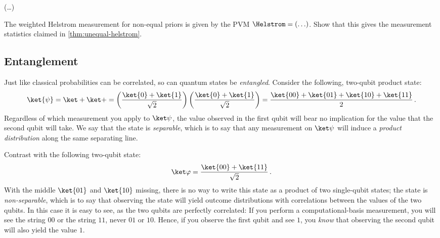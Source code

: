           \begin{exercise}
            (\ldots)
            \begin{subex}
              \item The weighted Helstrom measurement for non-equal priors is given
                by the PVM $\Helstrom = (\ldots)$. Show that this gives the
                measurement statistics claimed in \cref{thm:unequal-helstrom}.
            \end{subex}
          \end{exercise}
        \fi

        \let\unknown\undefined
        \let\orthpsi\undefined
        \let\orthphi\undefined

  \subsection{Entanglement}\label{sec:entanglement}
    Just like classical probabilities can be correlated, so can quantum states
      be \emph{entangled}. Consider the following, two-qubit product state:
    \[
      \ket{\psi} = \ket + \ket + 
      = \left( \frac{
        \ket{0} + \ket{1}
      }{\sqrt 2}\right )
      \left( \frac{
        \ket{0} + \ket{1}
      }{\sqrt 2}\right )
      = \frac{
        \ket{00} + \ket{01} + \ket{10} + \ket{11}
      }{2}\, .
    \]
    Regardless of which measurement you apply to $\ket \psi$, the value
      observed in the first qubit will bear no implication for the value 
      that the second qubit will take. We say
      that the state is \emph{separable}, which is to say that 
      any measurement on $\ket\psi$ will induce a \emph{product distribution} along the
      same separating line.

    Contrast with the following two-qubit state:
    \[
      \ket\varphi 
      = \frac{
        \ket{00} + \ket{11}
      }{\sqrt 2}\, .
    \]
    With the middle $\ket{01}$ and $\ket{10}$ missing, there is no way to write
      this state as a product of two single-qubit states; the state is
      \emph{non-separable}, which is to say that observing the state will yield
      outcome distributions with correlations between the values of the two
      qubits. In this case it is easy to see, as the two qubits are perfectly
      correlated: If you perform a computational-basis measurement, you will see
      the string $00$ or the string $11$, never $01$ or $10$. Hence, if you
      observe the first qubit and see $1$, you \emph{know} that observing the
      second qubit will also yield the value $1$.

